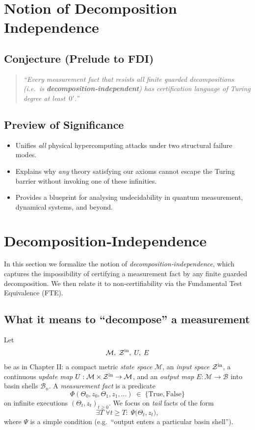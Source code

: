 \documentclass[12pt]{article}
\theoremstyle{definition}
\theoremstyle{plain}
\begin{document}
\section {Notion of Decomposition Independence}
\subsection{Conjecture (Prelude to FDI)}
\begin{quote}
\emph{“Every measurement fact that resists \emph{all} finite guarded decompositions (i.e.\ is \textbf{decomposition‑independent}) has certification language of Turing degree at least~$0'$.”}
\end{quote}

\subsection{Preview of Significance}
\begin{itemize}
  \item Unifies \emph{all} physical hypercomputing attacks under two structural failure modes.
  \item Explains why \emph{any} theory satisfying our axioms cannot escape the Turing barrier without invoking one of these infinities.
  \item Provides a blueprint for analysing undecidability in quantum measurement, dynamical systems, and beyond.
\end{itemize}

\section{Decomposition‑Independence}

In this section we formalize the notion of \emph{decomposition‑independence}, which captures the impossibility of certifying a measurement fact by any finite guarded decomposition.  We then relate it to non‑certifiability via the Fundamental Test Equivalence (FTE).

\subsection{What it means to ``decompose'' a measurement}

Let
\[
  \mathcal M,\;\mathcal Z^{\rm in},\;U,\;E
\]
be as in Chapter II: a compact metric \emph{state space} $\mathcal M$, an \emph{input space} $\mathcal Z^{\rm in}$, a continuous \emph{update map} $U:\mathcal M\times\mathcal Z^{\rm in}\to\mathcal M$, and an \emph{output map} $E:\mathcal M\to\mathcal B$ into basin shells $\mathcal B_n$.  A \emph{measurement fact} is a predicate
\[
  \Phi(\Theta_0,z_0,\Theta_1,z_1,\dots)\;\in\;\{\text{True},\text{False}\}
\]
on infinite executions $(\Theta_t,z_t)_{t\ge0}$.  We focus on \emph{tail} facts of the form
\[
  \exists T\;\forall t\ge T:\; 
    \Psi\bigl(\Theta_t,z_t\bigr),
\]
where $\Psi$ is a simple condition (e.g.\ “output enters a particular basin shell”).
\end{document}
